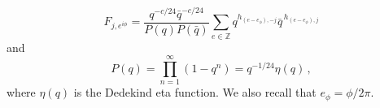 \documentclass[a4paper,10pt]{article}
\newcommand{\linnea}[1]{$\framebox{\tiny L}$\ \textbf{\texttt{{\color{red}\footnotesize#1}}}}
\newcommand{\jesper}[1]{$\framebox{\tiny J}$\ \textbf{\texttt{{\color{cyan}\footnotesize#1}}}}
\newcommand{\FN}{F}
\begin{document}
%
 \begin{equation}\label{F-func}
 \FN_{j,e^{i\phi}} = \frac{q^{-c/24}\bar{q}^{-c/24}}{P(q)P(\bar{q})} \sum_{e \in \mathbb{Z}} q^{h_{(e-e_\phi),-j}}\bar{q}^{\,h_{(e-e_\phi),j}}
\end{equation}
and  
\begin{equation}
\displaystyle P(q) =  \prod_{n=1}^{\infty} (1 - q^n) = q^{-1/24} \eta (q) \,,
\end{equation}
%
where $\eta(q)$ is the Dedekind eta function. We also recall that $e_\phi = \phi/2\pi$. 

\end{document}
